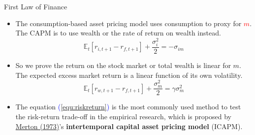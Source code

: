 \documentclass{beamer}
\begin{document}
\begin{frame}{First Law of Finance}
\begin{itemize}
	\item The consumption-based asset pricing model uses consumption to proxy for \textcolor{red}{$m$}. The CAPM is to use wealth or the rate of return on wealth instead.
	\begin{equation}
		\mathbb{E}_{t}\left[r_{i, t+1}-r_{f, t+1}\right]+\frac{\sigma_{i}^{2}}{2}=-\sigma_{i m}
		\end{equation}
	\item So we prove the return on the stock market or total wealth is linear for $m$. The expected excess market return is a linear function of its own volatility.
	\begin{equation}\label{equ:riskreturn}
		\mathbb{E}_{t}\left[r_{w, t+1}-r_{f, t+1}\right]+\frac{\sigma_{m}^{2}}{2}= \gamma\sigma^2_{m}
		\end{equation}
	\item The equation \textcolor{blue}{(\ref{equ:riskreturn})} is the most commonly used method to test the risk-return trade-off in the empirical research, which is proposed by \href{https://doi.org/10.2307/1913811}{\textcolor{blue}{}Merton (1973)}'s \textbf{intertemporal capital asset pricing model} (ICAPM).
\end{itemize}
\end{frame}
\end{document}
